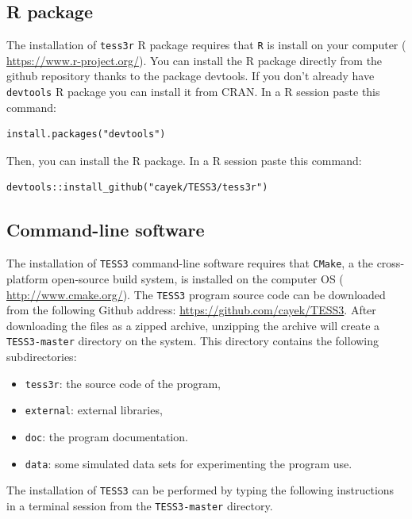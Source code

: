 \documentclass[10pt,a4paper]{article}
\begin{document}
\subsection{R package}
The installation of {\tt tess3r} R package requires that {\tt R} is install on your computer (\url{ 
https://www.r-project.org/}). You can install the R package directly from the github repository thanks to the package devtools. 
If you don't already have {\tt devtools} R package you can install it from CRAN. In a R session paste this command:

\begin{Verbatim}[frame = single]
install.packages("devtools")
\end{Verbatim}


Then, you can install the R package. In a R session paste this command:

\begin{Verbatim}[frame = single]
devtools::install_github("cayek/TESS3/tess3r")
\end{Verbatim}

\subsection{Command-line software} 

The installation of {\tt TESS3} command-line software requires that {\tt CMake}, a the cross-platform 
open-source build system, is installed on the computer OS (\url{ 
http://www.cmake.org/}).  The {\tt TESS3}  program source code can be downloaded 
from the following Github address: \url{https://github.com/cayek/TESS3}. After 
downloading the files as a zipped archive, unzipping the archive will create a 
{\tt TESS3-master} directory on the system. This  directory contains the 
following subdirectories:
\begin{itemize}
\item   {\tt tess3r}: the source code of the program,

\item   {\tt external}: external libraries,

\item     {\tt doc}: the program documentation.

\item     {\tt data}: some simulated data sets for experimenting the program 
use.
\end{itemize}
\noindent The installation of {\tt TESS3} can be performed by typing the 
following instructions in a terminal session from the {\tt TESS3-master} 
directory.
\end{document}
